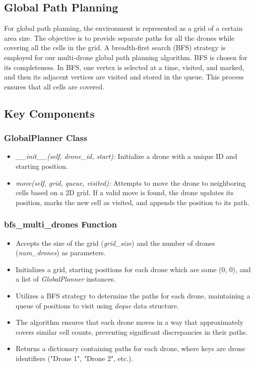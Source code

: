 
\subsection{Global Path Planning}

For global path planning, the environment is represented as a grid of a certain area size. The objective is to provide separate paths for all the drones while covering all the cells in the grid. A breadth-first search (BFS) strategy is employed for our multi-drone global path planning algorithm. BFS is chosen for its completeness. In BFS, one vertex is selected at a time, visited, and marked, and then its adjacent vertices are visited and stored in the queue. This process ensures that all cells are covered.

\subsection{Key Components}

\subsubsection{GlobalPlanner Class}

\begin{itemize}
    \item \textit{\_\_init\_\_(self, drone\_id, start):} Initialize a drone with a unique ID and starting position.
    \item \textit{move(self, grid, queue, visited):} Attempts to move the drone to neighboring cells based on a 2D grid. If a valid move is found, the drone updates its position, marks the new cell as visited, and appends the position to its path.
\end{itemize}

\subsubsection{bfs\_multi\_drones Function}

\begin{itemize}
    \item Accepts the size of the grid (\textit{grid\_size}) and the number of drones (\textit{num\_drones}) as parameters.
    \item Initializes a grid, starting positions for each drone which are same (0, 0), and a list of \textit{GlobalPlanner} instances.
    \item Utilizes a BFS strategy to determine the paths for each drone, maintaining a queue of positions to visit using \textit{deque} data structure.
    \item The algorithm ensures that each drone moves in a way that approximately covers similar cell counts, preventing significant discrepancies in their paths.
    \item Returns a dictionary containing paths for each drone, where keys are drone identifiers ("Drone 1", "Drone 2", etc.).
\end{itemize}

